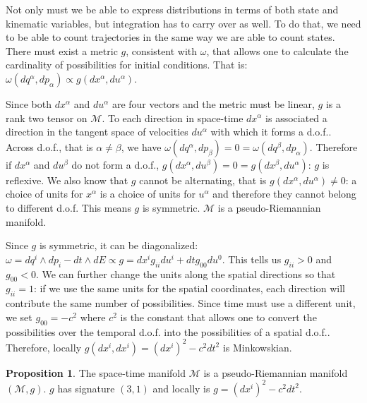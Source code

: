 \documentclass[aps,pra,10pt,twocolumn,floatfix,nofootinbib]{revtex4-1}
\numberwithin{equation}{section}
\theoremstyle{definition}
\newtheorem{prop}[equation]{Proposition}
\begin{document}
Not only must we be able to express distributions in terms of both state and kinematic variables, but integration has to carry over as well. To do that, we need to be able to count trajectories in the same way we are able to count states. There must exist a metric $g$, consistent with $\omega$, that allows one to calculate the cardinality of possibilities for initial conditions. That is: $\omega(dq^\alpha,dp_\alpha) \propto g(dx^\alpha,du^\alpha)$.

Since both $dx^\alpha$ and $du^\alpha$ are four vectors and the metric must be linear, $g$ is a rank two tensor on $\mathcal{M}$. To each direction in space-time $dx^\alpha$ is associated a direction in the tangent space of velocities $du^\alpha$ with which it forms a d.o.f.. Across d.o.f., that is $\alpha \neq \beta$, we have $\omega(dq^\alpha, dp_\beta) = 0 =\omega(dq^\beta, dp_\alpha)$. Therefore if $dx^\alpha$ and $du^\beta$ do not form a d.o.f., $g(dx^\alpha, du^\beta) = 0 = g(dx^\beta, du^\alpha)$: $g$ is reflexive. We also know that $g$ cannot be alternating, that is $g(dx^\alpha, du^\alpha) \neq 0$: a choice of units for $x^\alpha$ is a choice of units for $u^\alpha$ and therefore they cannot belong to different d.o.f. This means $g$ is symmetric. $\mathcal{M}$ is a pseudo-Riemannian manifold.

Since $g$ is symmetric, it can be diagonalized: $\omega= dq^i \wedge dp_i - dt \wedge dE \propto g = dx^i g_{ii} du^i + dt g_{00} du^0$. This tells us $g_{ii} > 0$ and $g_{00} < 0$. We can further change the units along the spatial directions so that $g_{ii}=1$: if we use the same units for the spatial coordinates, each direction will contribute the same number of possibilities. Since time must use a different unit, we set $g_{00}=-c^2$ where $c^2$ is the constant that allows one to convert the possibilities over the temporal d.o.f. into the possibilities of a spatial d.o.f.. Therefore, locally $g(dx^i, dx^i) = (dx^i)^2 - c^2 dt^2$ is Minkowskian.

\begin{prop}\label{riemannian_manifold}
	The space-time manifold $\mathcal{M}$ is a pseudo-Riemannian manifold $(\mathcal{M}, g)$. $g$ has signature $(3,1)$ and locally is $g = (dx^i)^2 - c^2 dt^2$.
\end{prop}
\end{document}
